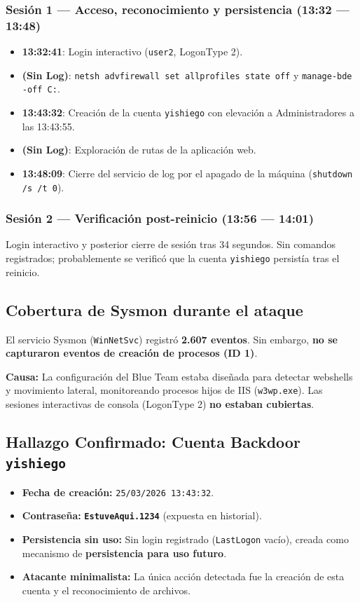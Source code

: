 \subsubsection*{Sesión 1 --- Acceso, reconocimiento y persistencia (13:32 --- 13:48)}
\begin{itemize}
    \item \textbf{13:32:41}: Login interactivo (\texttt{user2}, LogonType 2).
    \item \textbf{(Sin Log)}: \texttt{netsh advfirewall set allprofiles state off} y \texttt{manage-bde -off C:}.
    \item \textbf{13:43:32}: Creación de la cuenta \texttt{yishiego} con elevación a Administradores a las 13:43:55.
    \item \textbf{(Sin Log)}: Exploración de rutas de la aplicación web.
    \item \textbf{13:48:09}: Cierre del servicio de log por el apagado de la máquina (\texttt{shutdown /s /t 0}).
\end{itemize}

\subsubsection*{Sesión 2 --- Verificación post-reinicio (13:56 --- 14:01)}
Login interactivo y posterior cierre de sesión tras 34 segundos. Sin comandos registrados; probablemente se verificó que la cuenta \texttt{yishiego} persistía tras el reinicio.

\subsection{Cobertura de Sysmon durante el ataque}
El servicio Sysmon (\texttt{WinNetSvc}) registró \textbf{2.607 eventos}. Sin embargo, \textbf{no se capturaron eventos de creación de procesos (ID 1)}. 

\textbf{Causa:} La configuración del Blue Team estaba diseñada para detectar webshells y movimiento lateral, monitoreando procesos hijos de IIS (\texttt{w3wp.exe}). Las sesiones interactivas de consola (LogonType 2) \textbf{no estaban cubiertas}.

\subsection{Hallazgo Confirmado: Cuenta Backdoor \texttt{yishiego}}
\begin{itemize}
    \item \textbf{Fecha de creación:} \texttt{25/03/2026 13:43:32}.
    \item \textbf{Contraseña:} \textbf{\texttt{EstuveAqui.1234}} (expuesta en historial).
    \item \textbf{Persistencia sin uso:} Sin login registrado (\texttt{LastLogon} vacío), creada como mecanismo de \textbf{persistencia para uso futuro}.
    \item \textbf{Atacante minimalista:} La única acción detectada fue la creación de esta cuenta y el reconocimiento de archivos.
\end{itemize}


